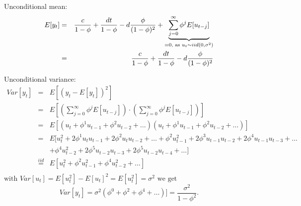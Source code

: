 \documentclass[a4paper]{scrartcl}
\begin{document}
\begin{enumerate}
\begin{solution}
		Unconditional mean:
		\begin{eqnarray*}
			E[y_{t}] &=& \frac{c}{1-\phi} + \frac{dt}{1-\phi} - d \frac{\phi}{(1 - \phi)^2}  + \underbrace{\sum_{j=0}^{\infty} \phi^j E[u_{t-j}]}_{=0 \text{, as } \space  u_{t} \sim iid(0, \sigma^2)} \\
			&=& \frac{c}{1-\phi} + \frac{dt}{1-\phi} - d \frac{\phi}{(1 - \phi)^2}
		\end{eqnarray*}	
	
		Unconditional variance:
		\begin{eqnarray*}
			Var[y_{t}] 
			&=& E[(y_{t} - E[y_{t}])^2 ] \\
			&=& E[(\sum_{j=0}^{\infty} \phi^j E[u_{t-j}]) \cdot (\sum_{j=0}^{\infty} \phi^j E[u_{t-j}])] \\
			&=& E[(u_{t} + \phi^1 u_{t-1} + \phi^2 u_{t-2} + \dots)(u_{t} + \phi^1 u_{t-1} + \phi^2 u_{t-2} + \dots)] \\
			&=& E[	u_{t}^2 + 2\phi^1 u_{t}u_{t-1} + 2\phi^2 u_{t}u_{t-2} + \dots + 
			\phi^2 u_{t-1}^2 + 2\phi^3 u_{t-1}u_{t-2} + 2\phi^4 u_{t-1}u_{t-3} + \dots  \\
			&&+ \phi^4 u_{t-2}^2 + 2\phi^5 u_{t-2}u_{t-3} + 2\phi^5 u_{t-2}u_{t-4} + \dots ] \\
			&\overset{iid}{=}& E [ u_{t}^2+ \phi^2 u_{t-1}^2 + \phi^4 u_{t-2}^2 + \dots ] \\
		\end{eqnarray*}
		$\text{with } Var[u_{t}] = E[u_{t}^2] - E[u_{t}]^2 = E[u_{t}^2] = \sigma^2 \text{ we get}$
		\begin{displaymath}
		Var[y_{t}] = \sigma^2 ( \phi^0 + \phi^2 + \phi^4 + \dots )] = \frac{\sigma^2}{1-\phi^2}.
		\end{displaymath}
	

\end{solution}
\end{enumerate}
\end{document}
